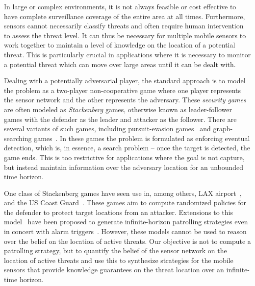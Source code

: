 In large or complex environments, it is not always feasible or cost effective to have complete surveillance coverage of the entire area at all times. Furthermore, sensors cannot necessarily classify threats and often require human intervention to assess the threat level. It can thus be necessary for multiple mobile sensors to work together to maintain a level of knowledge on the location of a potential threat. This is particularly crucial in applications where it is necessary to monitor a potential threat which can move over large areas until it can be dealt with.  

Dealing with a potentially adversarial player, the standard approach is to model the problem as a two-player non-cooperative game where one player represents the sensor network and the other represents the adversary. These \emph{security games} are often modeled as \emph{Stackenberg} games, otherwise known as leader-follower games with the defender as the leader and attacker as the follower. There are several variants of such games, including pursuit-evasion games~\cite{Chung2011} and graph-searching games~\cite{Kreutzer11}. In these games the problem is formulated as enforcing eventual detection, which is, in essence, a search problem – once the target is detected, the game ends. This is too restrictive for applications where the goal is not capture, but instead maintain information over the adversary location for an unbounded time horizon.

One class of Stackenberg games have seen use in, among others, LAX airport~\cite{Pita08},~\cite{jain2012overview} and the US Coast Guard~\cite{An11}. These games aim to compute randomized policies for the defender to protect target locations from an attacker. Extensions to this model~\cite{Basilico12} have been proposed to generate infinite-horizon patrolling strategies even in concert with alarm triggers~\cite{basilico2016security,Munoz13}. However, these models cannot be used to reason over the belief on the location of active threats. Our objective is not to compute a patrolling strategy, but to quantify the belief of the sensor network on the location of active threats and use this to synthesize strategies for the mobile sensors that provide knowledge guarantees on the threat location over an infinite-time horizon.

